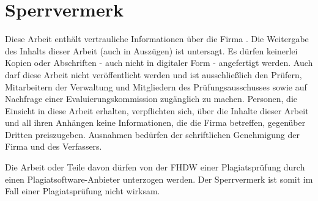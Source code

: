 \section*{Sperrvermerk}

Diese Arbeit enthält vertrauliche Informationen über die Firma \koorperationsunternehmen. Die Weitergabe des Inhalts dieser Arbeit
(auch in Auszügen) ist untersagt. Es dürfen keinerlei Kopien oder Abschriften - auch nicht in digitaler Form - angefertigt werden.
Auch darf diese Arbeit nicht veröffentlicht werden und ist ausschließlich den Prüfern, Mitarbeitern der Verwaltung und Mitgliedern
des Prüfungsausschusses sowie auf Nachfrage einer Evaluierungskommission zugänglich zu machen. Personen, die Einsicht in diese Arbeit
erhalten, verpflichten sich, über die Inhalte dieser Arbeit und all ihren Anhängen keine Informationen, die die Firma
\koorperationsunternehmen{} betreffen, gegenüber Dritten preiszugeben. Ausnahmen bedürfen der schriftlichen Genehmigung der
Firma \koorperationsunternehmen{} und des Verfassers.


Die Arbeit oder Teile davon dürfen von der FHDW einer Plagiatsprüfung durch einen Plagiatsoftware-Anbieter unterzogen werden. Der
Sperrvermerk ist somit im Fall einer Plagiatsprüfung nicht wirksam.
\newpage
\fancyhead[R]{\leftmark}